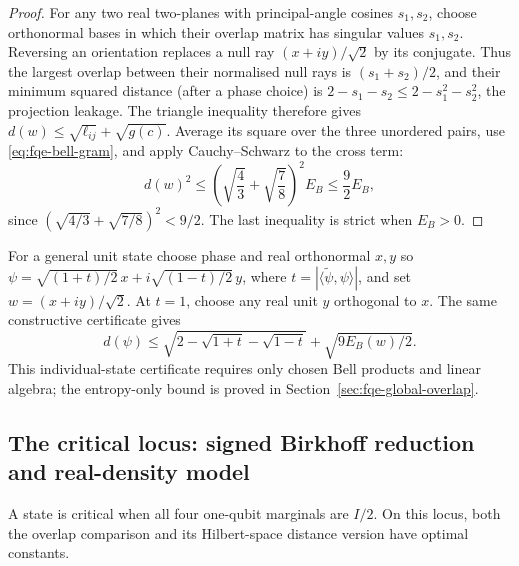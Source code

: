 \begin{proof}
For any two real two-planes with principal-angle cosines $s_1,s_2$,
choose orthonormal bases in which their overlap matrix has singular values
$s_1,s_2$. Reversing an orientation replaces a null ray
$(x+iy)/\sqrt2$ by its conjugate. Thus the largest overlap between
their normalised null rays is $(s_1+s_2)/2$, and their minimum
squared distance (after a phase choice) is
$2-s_1-s_2\le2-s_1^2-s_2^2$, the projection leakage.
The triangle inequality therefore gives
$d(w)\le\sqrt{\ell_{ij}}+\sqrt{g(c)}$.
Average its square over the three unordered pairs, use
\eqref{eq:fqe-bell-gram}, and apply Cauchy--Schwarz to the cross term:
\[
 d(w)^2\le\left(\sqrt{\frac43}+\sqrt{\frac78}\right)^2E_B
          \le\frac92 E_B,
\]
since $(\sqrt{4/3}+\sqrt{7/8})^2<9/2$. The last inequality is strict when $E_B>0$.
\end{proof}

For a general unit state choose phase and real orthonormal $x,y$ so
$\psi=\sqrt{(1+t)/2}\,x+i\sqrt{(1-t)/2}\,y$,
where $t=|\langle\tilde\psi,\psi\rangle|$, and set $w=(x+iy)/\sqrt2$.
At $t=1$, choose any real unit $y$ orthogonal to $x$.
The same constructive certificate gives
\[
 d(\psi)\le\sqrt{2-\sqrt{1+t}-\sqrt{1-t}}+\sqrt{9E_B(w)/2}.
\]
This individual-state certificate requires only chosen Bell products and
linear algebra; the entropy-only bound is proved in
Section~\ref{sec:fqe-global-overlap}.

\subsection{The critical locus: signed Birkhoff reduction and real-density model}
\label{sec:fqe-critical-orbit-proof}
A state is critical when all four one-qubit marginals are $I/2$. On this locus, both the overlap comparison and its Hilbert-space distance
version have optimal constants.

